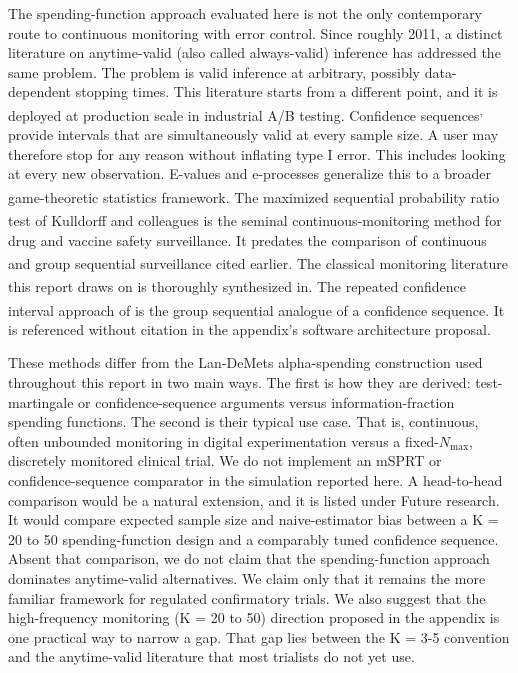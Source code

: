 \documentclass[
  11pt,
]{article}
\begin{document}
The spending-function approach evaluated here is not
the only contemporary route to continuous monitoring
with error control. Since roughly 2011, a distinct
literature on anytime-valid (also called always-valid)
inference has addressed the same problem. The problem
is valid inference at arbitrary, possibly
data-dependent stopping times. This literature starts
from a different point, and it is deployed at
production scale in industrial A/B testing\textsuperscript{}. Confidence sequences\textsuperscript{,} provide
intervals that are simultaneously valid at every sample
size. A user may therefore stop for any reason without
inflating type I error. This includes looking at every
new observation. E-values and e-processes generalize
this to a broader game-theoretic statistics framework\textsuperscript{}. The maximized sequential probability
ratio test of Kulldorff and colleagues\textsuperscript{} is the seminal
continuous-monitoring method for drug and vaccine
safety surveillance. It predates the comparison of
continuous and group sequential surveillance cited
earlier\textsuperscript{}. The
classical monitoring literature this report draws on is
thoroughly synthesized in\textsuperscript{}. The
repeated confidence interval approach of\textsuperscript{} is the group sequential analogue
of a confidence sequence. It is referenced without
citation in the appendix's software architecture
proposal.

These methods differ from the Lan-DeMets alpha-spending
construction used throughout this report in two main
ways. The first is how they are derived:
test-martingale or confidence-sequence arguments versus
information-fraction spending functions. The second is
their typical use case. That is, continuous, often
unbounded monitoring in digital experimentation versus
a fixed-\(N_{\max}\), discretely monitored clinical
trial. We do not implement an mSPRT or
confidence-sequence comparator in the simulation
reported here. A head-to-head comparison would be a
natural extension, and it is listed under Future
research. It would compare expected sample size and
naive-estimator bias between a K = 20 to 50
spending-function design and a comparably tuned
confidence sequence. Absent that comparison, we do not
claim that the spending-function approach dominates
anytime-valid alternatives. We claim only that it
remains the more familiar framework for regulated
confirmatory trials. We also suggest that the
high-frequency monitoring (K = 20 to 50) direction
proposed in the appendix is one practical way to narrow
a gap. That gap lies between the K = 3-5 convention and
the anytime-valid literature that most trialists do not
yet use.
\end{document}
